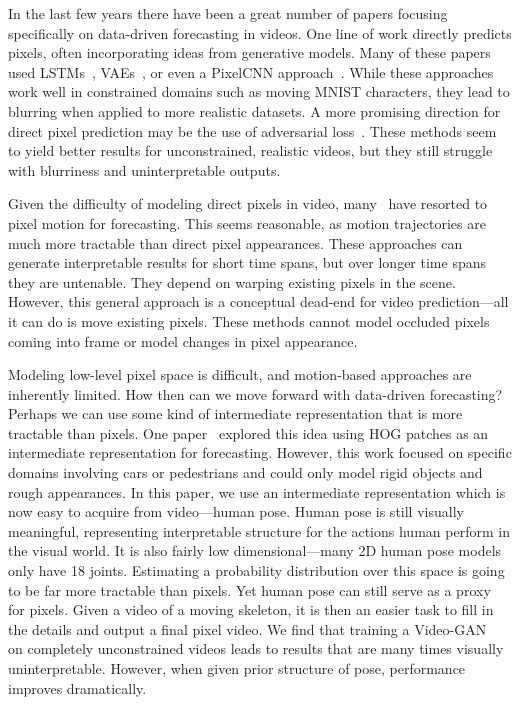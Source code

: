  In the last few years there have been a great number of papers focusing specifically on data-driven forecasting in videos. One line of work directly predicts pixels, often incorporating ideas from generative models. Many of these papers used LSTMs~\cite{Srivastava15, Ranzato14, Patraucean16}, VAEs~\cite{Xue16}, or even a PixelCNN approach~\cite{Kalchbrenner16}. While these approaches work well in constrained domains such as moving MNIST characters, they lead to blurring when applied to more realistic datasets. A more promising direction for direct pixel prediction may be the use of adversarial loss~\cite{Vondrick16, Matthieu16}. These methods seem to yield better results for unconstrained, realistic videos, but they still struggle with blurriness and uninterpretable outputs.

Given the difficulty of modeling direct pixels in video, many~\cite{Yuen10, Pintea14, Walker15, Walker16, Brabandere16} have resorted to pixel motion for forecasting. This seems reasonable, as motion trajectories are much more tractable than direct pixel appearances. These approaches can generate interpretable results for short time spans, but over longer time spans they are untenable. They depend on warping existing pixels in the scene. However, this general approach is a conceptual dead-end for video prediction---all it can do is move existing pixels. These methods cannot model occluded pixels coming into frame or model changes in pixel appearance. 

Modeling low-level pixel space is difficult, and motion-based approaches are inherently limited. How then can we move forward with data-driven forecasting? Perhaps we can use some kind of intermediate representation that is more tractable than pixels. One paper~\cite{Walker14} explored this idea using HOG patches as an intermediate representation for forecasting. However, this work focused on specific domains involving cars or pedestrians and could only model rigid objects and rough appearances. In this paper, we use an intermediate representation which is now easy to acquire from video---human pose. Human pose is still visually meaningful, representing interpretable structure for the actions human perform in the visual world. It is also fairly low dimensional---many 2D human pose models only have 18 joints. Estimating a probability distribution over this space is going to be far more tractable than pixels. Yet human pose can still serve as a proxy for pixels. Given a video of a moving skeleton, it is then an easier task to fill in the details and output a final pixel video. We find that training a Video-GAN~\cite{Vondrick16} on completely unconstrained videos leads to results that are many times visually uninterpretable. However, when given prior structure of pose, performance improves dramatically. 